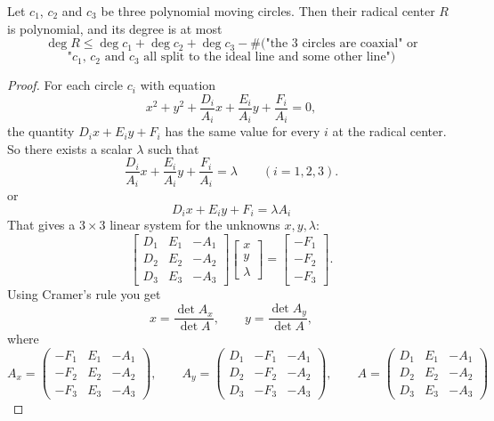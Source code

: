 \documentclass[a4paper]{article}
\begin{document}
\begin{theorem}
    Let $c_1$, $c_2$ and $c_3$ be three polynomial moving circles. Then their radical center $R$ is polynomial, and its degree is at most
    $$\deg R\le\deg c_1+\deg c_2+\deg c_3 -\#(\text{"the 3 circles are coaxial" or}$$
    $$\text{"$c_1$, $c_2$ and $c_3$ all split to the ideal line and some other line"})$$
\end{theorem}
\begin{proof}
    For each circle $c_i$ with equation
$$
x^2 + y^2 + \frac{D_i}{A_i} x + \frac{E_i}{A_i} y + \frac{F_i}{A_i} = 0,
$$
the quantity \(D_i x + E_i y + F_i\) has the same value for every \(i\) at the radical center. So there exists a scalar \(\lambda\) such that
$$
\frac{D_i}{A_i} x + \frac{E_i}{A_i} y + \frac{F_i}{A_i} = \lambda \qquad (i=1,2,3).
$$
or
$$D_i x + E_i y + F_i = \lambda A_i$$
That gives a \(3\times3\) linear system for the unknowns \(x, y, \lambda\):
$$
\begin{bmatrix}
D_1 & E_1 & -A_1\\[4pt]
D_2 & E_2 & -A_2\\[4pt]
D_3 & E_3 & -A_3
\end{bmatrix}
\begin{bmatrix}
x\\[4pt] y\\[4pt] \lambda
\end{bmatrix}
=
\begin{bmatrix}
-F_1\\[4pt] -F_2\\[4pt] -F_3
\end{bmatrix}.
$$
\noindent
Using Cramer’s rule you get
$$
x = \frac{\det A_x}{\det A}, \qquad
y = \frac{\det A_y}{\det A},
$$
where
$$
A_x =
\begin{pmatrix}
-F_1 & E_1 & -A_1\\[4pt]
-F_2 & E_2 & -A_2\\[4pt]
-F_3 & E_3 & -A_3
\end{pmatrix}, \qquad
A_y =
\begin{pmatrix}
D_1 & -F_1 & -A_1\\[4pt]
D_2 & -F_2 & -A_2\\[4pt]
D_3 & -F_3 & -A_3
\end{pmatrix}, \qquad
A =
\begin{pmatrix}
D_1 & E_1 & -A_1\\[4pt]
D_2 & E_2 & -A_2\\[4pt]
D_3 & E_3 & -A_3
\end{pmatrix}
$$


\end{proof}
\end{document}
